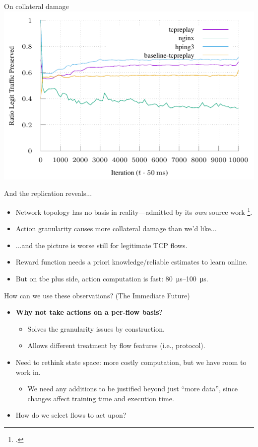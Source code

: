\documentclass[aspectratio=169,xcolor={dvipsnames}
,hide notes
]{beamer}
\begin{document}
\begin{frame}{On collateral damage}
\centering
\includegraphics[width=0.8\linewidth]{../plots/online-varyN-nginx.pdf}
\end{frame}

\begin{frame}{And the replication reveals...}	
\begin{itemize}
	\item Network topology has no basis in reality---admitted by its \emph{own} source work \footcite{DBLP:journals/ccr/MahajanBFIPS02a}.
	
	\item Action granularity causes more collateral damage than we'd like...
	
	\item ...and the picture is worse still for legitimate TCP flows.
	
	\item Reward function needs a priori knowledge/reliable estimates to learn online.
	
	\item \alert{But on tbe plus side, action computation is fast: \SIrange{80}{100}{\micro\second}.}
\end{itemize}
\end{frame}

\begin{frame}{How can we use these observations? (The Immediate Future)}
\begin{itemize}
	\item \textbf{\alert{Why not take actions on a per-flow basis}}?
	\begin{itemize}
		\item Solves the granularity issues by construction.
		\item Allows different treatment by flow features (i.e., protocol).
	\end{itemize}
	\item Need to rethink state space: more costly computation, but we have room to work in.
	\begin{itemize}
		\item We need any additions to be justified beyond just ``more data'', since \alert{changes affect training time and execution time}.
	\end{itemize}
	\item How do we select flows to act upon?
\end{itemize}
\end{frame}
\end{document}
